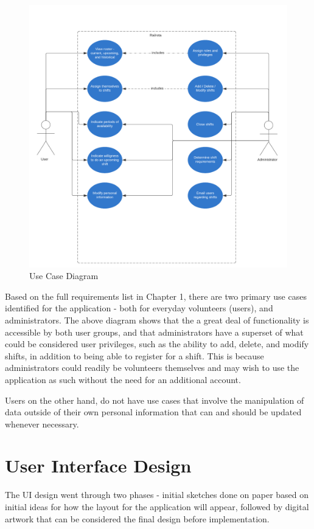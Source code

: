 \begin{figure}[h]
    \includegraphics[width=\textwidth]{Figures/usecase}
    \caption{Use Case Diagram}
    \label{fig:usecase}
\end{figure}

Based on the full requirements list in Chapter 1, there are two primary use cases identified for the application - both for everyday volunteers (users), and administrators. The above diagram shows that the a great deal of functionality is accessible by both user groups, and that administrators have a superset of what could be considered user privileges, such as the ability to add, delete, and modify shifts, in addition to being able to register for a shift. This is because administrators could readily be volunteers themselves and may wish to use the application as such without the need for an additional account.

Users on the other hand, do not have use cases that involve the manipulation of data outside of their own personal information that can and should be updated whenever necessary.

\section{User Interface Design}
The UI design went through two phases - initial sketches done on paper based on initial ideas for how the layout for the application will appear, followed by digital artwork that can be considered the final design before implementation.

